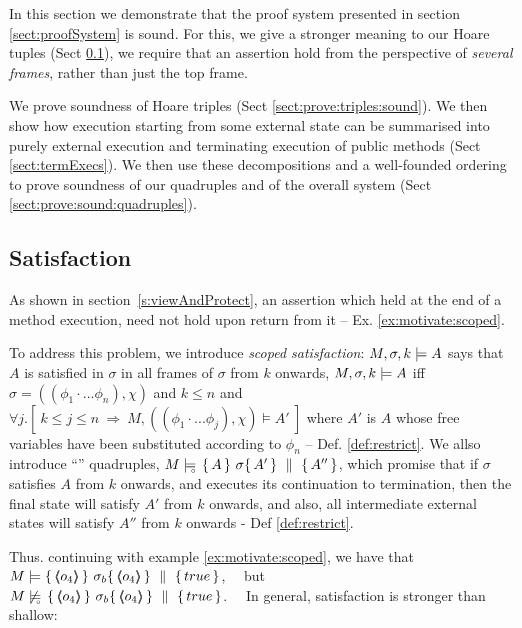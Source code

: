

In this section we demonstrate that the proof system presented in section \ref{sect:proofSystem} is sound. 
For this, we give a stronger meaning to our Hoare tuples  (Sect \ref{s:scoped:valid}), we require  that an  assertion hold from the perspective of \emph{several frames}, rather than just the top frame.

We prove soundness  of Hoare triples (Sect \ref{sect:prove:triples:sound}).
We then show how execution starting from some external state can be summarised into purely external execution and terminating execution of public methods (Sect \ref{sect:termExecs}). We then use these decompositions and a well-founded ordering to prove soundness of our quadruples  and of the overall system (Sect \ref{sect:prove:sound:quadruples}).


\subsection{\Scoped Satisfaction} 
\label{s:scoped:valid}


As shown in section~\ref{s:viewAndProtect}, an assertion which held at the end of a method execution, need not hold upon return from it -- \cf Ex. \ref{ex:motivate:scoped}.  
 


 

To address this problem, we introduce \emph{scoped satisfaction}: %
 $ M,\sigma ,{k} \models {A} $   says that $A$ is satisfied in $\sigma$  in all frames of $\sigma$ from $k$ onwards, 
\ie  $ M,\sigma ,{k} \models {A} $ iff $\sigma = ((\phi_1\cdot ... \phi_n), \chi)$ and $k\leq n$ and $\forall j. [\  k\leq j \leq n \ \Rightarrow \ M, ((\phi_1\cdot ... \phi_j), \chi) \models A'\ ]$ where $A'$ is $A$ whose free variables have been substituted according to $\phi_n$ -- \cf Def. \ref{def:restrict}.
We allso introduce ``\scoped'' quadruples,   $M \models\!\!\!\!_{_{\circ}}\   \{\, A \, \}\ \sigma \{\, A' \, \} \, \,\parallel\,\, \{\, A'' \, \} $, which promise that if $\sigma$ satisfies $A$ from $k$ onwards, and executes its continuation to termination, then the final state will satisfy $A'$ from $k$ onwards, and also, all intermediate external states will satisfy $A''$ from $k$ onwards - \cf Def \ref{def:restrict}.


Thus. continuing with example \ref{ex:motivate:scoped},  we have that\ \  $\satisfies {M} {\quadruple   {\inside {o_4}} }   {\sigma_b}   {\inside {o_4}}  {true} $, \ \ 
 but \\ $\notSatisfiesD {M}   {\quadruple   {\inside {o_4}} }  {\sigma_b}   {\inside {o_4}}  {true}  $.
\ \  In general, \scoped satisfaction is stronger than shallow:   
 

